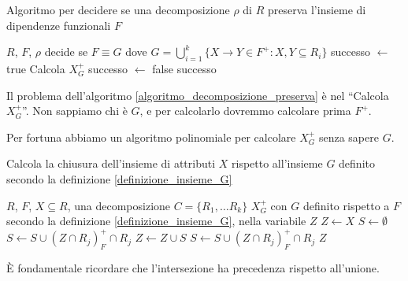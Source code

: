 \begin{algorithm}
\caption{Algoritmo per decidere se una decomposizione $\rho$ di $R$ preserva l'insieme di dipendenze funzionali $F$ \label{algoritmo_decomposizione_preserva}}
\begin{algorithmic}
\Require $R$, $F$, $\rho$
\Ensure decide se $F \equiv G$ dove $G = \bigcup_{i = 1}^{k} \{ X \to Y \in F^+ : X, Y \subseteq R_i \}$
\State successo $\gets$ true
    \State Calcola $X_{G}^{+}$
        \State successo $\gets$ false
    \EndIf
\EndFor
\State \Return successo
\end{algorithmic}
\end{algorithm}

Il problema dell'algoritmo \ref{algoritmo_decomposizione_preserva} \`e nel ``Calcola $X_{G}^{+}$''. Non sappiamo chi \`e $G$, e per calcolarlo dovremmo calcolare prima $F^+$.

Per fortuna abbiamo un algoritmo polinomiale per calcolare $X_{G}^{+}$ senza sapere $G$.
 
\begin{algorithm}
\caption{Calcola la chiusura dell'insieme di attributi $X$ rispetto all'insieme $G$ definito secondo la definizione \ref{definizione_insieme_G} \label{algoritmo_calcola_chiusura}}
\begin{algorithmic}
\Require $R$, $F$, $X \subseteq R$, una decomposizione $C = \{R_1, \dots R_k\}$
\Ensure $X^{+}_{G}$ con $G$ definito rispetto a $F$ secondo la definizione \ref{definizione_insieme_G}, nella variabile $Z$
\State $Z\gets X$
\State $S\gets \emptyset$
    \State $S \gets S \cup (Z \cap R_j)_{F}^{+} \cap R_j$
\EndFor
{}
    \State $Z\gets Z \cup S$
        \State $S \gets S \cup (Z \cap R_j)_{F}^{+} \cap R_j$
    \EndFor
\EndWhile
\State \Return $Z$
\end{algorithmic}
\end{algorithm}

\`E fondamentale ricordare che l'intersezione ha precedenza rispetto all'unione.

